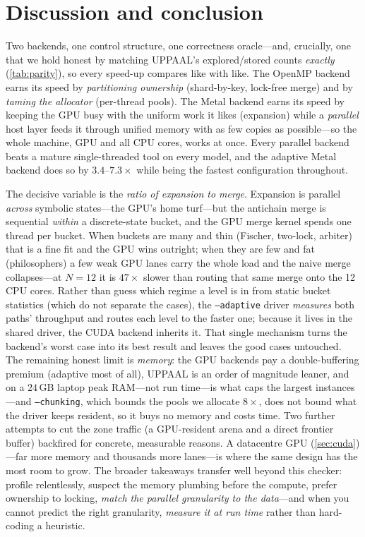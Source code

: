 \documentclass[11pt]{article}
\newcommand{\code}[1]{\texttt{\small #1}}
\begin{document}
\section{Discussion and conclusion}
Two backends, one control structure, one correctness oracle---and, crucially, one that we hold
honest by matching UPPAAL's explored/stored counts \emph{exactly} (\cref{tab:parity}), so every
speed-up compares like with like. The OpenMP backend earns its speed by \emph{partitioning
ownership} (shard-by-key, lock-free merge) and by \emph{taming the allocator} (per-thread pools).
The Metal backend earns its speed by keeping the GPU busy with the uniform work it likes
(expansion) while a \emph{parallel} host layer feeds it through unified memory with as few copies as
possible---so the whole machine, GPU and all CPU cores, works at once. Every parallel backend beats a
mature single-threaded tool on every model, and the adaptive Metal backend does so by
$3.4$--$7.3\times$ while being the fastest configuration throughout.

The decisive variable is the \emph{ratio of expansion to merge}. Expansion is parallel \emph{across}
symbolic states---the GPU's home turf---but the antichain merge is sequential \emph{within} a
discrete-state bucket, and the GPU merge kernel spends one thread per bucket. When buckets are many
and thin (Fischer, two-lock, arbiter) that is a fine fit and the GPU wins outright; when they are few
and fat (philosophers) a few weak GPU lanes carry the whole load and the naive merge collapses---at
$N{=}12$ it is $47\times$ slower than routing that same merge onto the 12 CPU cores. Rather than guess
which regime a level is in from static bucket statistics (which do not separate the cases), the
\code{--adaptive} driver \emph{measures} both paths' throughput and routes each level to the faster
one; because it lives in the shared driver, the CUDA backend inherits it. That single mechanism turns
the backend's worst case into its best result and leaves the good cases untouched. The remaining
honest limit is \emph{memory}: the GPU backends pay a double-buffering premium (adaptive most of all),
UPPAAL is an order of magnitude leaner, and on a $24$\,GB laptop peak RAM---not run time---is what
caps the largest instances---and \code{--chunking}, which bounds the pools we allocate $8\times$,
does not bound what the driver keeps resident, so it buys no memory and costs time. Two further
attempts to cut the zone traffic (a GPU-resident arena and a direct
frontier buffer) backfired for concrete, measurable reasons. A datacentre GPU
(\cref{sec:cuda})---far more memory and thousands more lanes---is where the same design has the most
room to grow. The broader takeaways transfer well beyond this checker: profile relentlessly, suspect
the memory plumbing before the compute, prefer ownership to locking, \emph{match the parallel
granularity to the data}---and when you cannot predict the right granularity, \emph{measure it at run
time} rather than hard-coding a heuristic.
\end{document}
